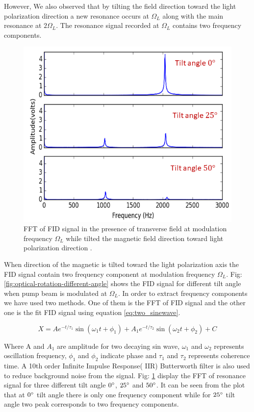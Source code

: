 However, We also observed that by tilting the field direction toward the light polarization direction a new resonance occurs at $\Omega_L$ along with the main resonance at $2\Omega_L$. The resonance signal recorded at $\Omega_L$ contains two frequency components.
\begin{figure}[h]
\centering\includegraphics[width=0.7\linewidth]{figures/fft_amp.png}
\caption{FFT of FID  signal in the presence of transverse field at modulation frequency $\Omega_L$ while tilted the magnetic field direction toward light polarization direction  .\label{fig:fft-amplitude}}
\end{figure}


When direction of the magnetic is tilted toward the light polarization axis  the FID signal contain two frequency component at modulation frequency $\Omega_L$. Fig: \ref{fig:optical-rotation-different-angle} shows the FID signal for different tilt angle when pump beam is modulated at $\Omega_L$. In order to extract frequency components we have used two methods. One of them is the FFT of FID signal and the other one is the fit FID signal using equation \ref{eq:two_sinewave}.

\begin{equation}
     X = A e^{-t /\tau_1} \sin(\omega_1 t + \phi_1) + A_1 e^{-t /\tau_2}  \sin (\omega_2 t + \phi_2) + C  
     \label{eq:two_sinewave}
\end{equation}

Where A and $A_1$ are amplitude for two decaying sin wave, $\omega_1$ and $\omega_2$ represents oscillation frequency, $\phi_1$ and $\phi_2$ indicate phase and $\tau_1$ and $\tau_2$ represents coherence time. A 10th order Infinite Impulse Response( IIR) Butterworth filter is also used to reduce background noise from the signal.
Fig: \ref{fig:fft-amplitude} display the FFT of resonance signal for three different  tilt angle $0\degree$, $25\degree$ and $50\degree$. It can be seen from the plot that at $0\degree$ tilt angle there is only one frequency component while for $25\degree$ tilt angle two peak corresponds to two frequency components.

